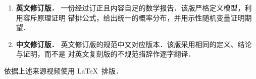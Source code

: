 \begin{titlepage}
\begin{minipage}{0.86\textwidth}
\begin{enumerate}
  \item \textbf{英文修订版．}
    一份经过订正且内容自足的数学报告．该版严格定义模型，利用容斥原理证明
    错排公式，给出统一的概率分布，并用示性随机变量证明期望．

  \item \textbf{中文修订版．}
    英文修订版的规范中文对应版本．该版采用相同的定义、结论与证明，而不是
    对英文复刻版的不规范措辞作逐字翻译．
\end{enumerate}

\medskip
\noindent
{}

\end{minipage}

\vfill
{\small 依据上述来源视频使用 \LaTeX\ 排版．\par}

\end{titlepage}
\hypersetup{pageanchor=true}
